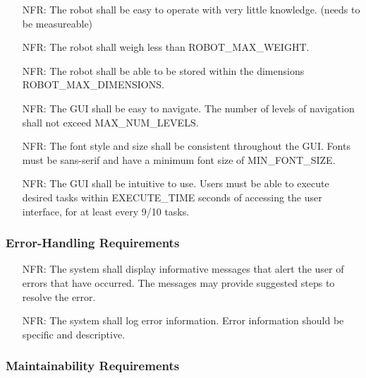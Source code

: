 \documentclass[12pt]{article}
\newcounter{nfrnum} %
\begin{document}
\noindent \begin{itemize}
\item[NFR\refstepcounter{nfrnum}\thenfrnum \label{NFR_Usability1}:] The robot shall be easy to operate with very little knowledge. (needs to be measureable)
\item[NFR\refstepcounter{nfrnum}\thenfrnum \label{NFR_Usability2}:] The robot shall weigh less than ROBOT_MAX_WEIGHT.
\item[NFR\refstepcounter{nfrnum}\thenfrnum \label{NFR_Usability3}:] The robot shall be able to be stored within the dimensions ROBOT_MAX_DIMENSIONS.
\item[NFR\refstepcounter{nfrnum}\thenfrnum \label{NFR_Usability4}:] The GUI shall be easy to navigate. The number of levels of navigation shall not exceed MAX_NUM_LEVELS.
\item[NFR\refstepcounter{nfrnum}\thenfrnum \label{NFR_Usability5}:] The font style and size shall be consistent throughout the GUI. Fonts must be sans-serif and have a minimum font size of MIN_FONT_SIZE.
\item[NFR\refstepcounter{nfrnum}\thenfrnum \label{NFR_Usability6}:] The GUI shall be intuitive to use. Users must be able to execute desired tasks within EXECUTE_TIME seconds of accessing the user interface, for at least every 9/10 tasks.
\end{itemize}

\subsubsection{Error-Handling Requirements}
\noindent \begin{itemize}
\item[NFR\refstepcounter{nfrnum}\thenfrnum \label{NFR_Errors1}:] The system shall display informative messages that alert the user of errors that have occurred. The messages may provide suggested steps to resolve the error.
\item[NFR\refstepcounter{nfrnum}\thenfrnum \label{NFR_Errors1}:] The system shall log error information. Error information should be specific and descriptive.
\end{itemize}

\subsubsection{Maintainability Requirements}
\end{document}
